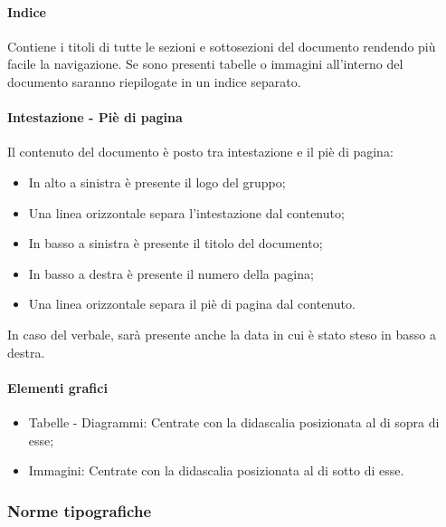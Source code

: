 \paragraph{Indice} 
Contiene i titoli di tutte le sezioni e sottosezioni del documento rendendo più facile la navigazione.
Se sono presenti tabelle o immagini all'interno del documento saranno riepilogate in un indice separato.

\paragraph{Intestazione - Piè di pagina} 
Il contenuto del documento è posto tra intestazione e il piè di pagina:

\begin{itemize}
\item In alto a sinistra è presente il logo del gruppo;
\item Una linea orizzontale separa l’intestazione dal contenuto;
\item In basso a sinistra è presente il titolo del documento;
\item In basso a destra è presente il numero della pagina;
\item Una linea orizzontale separa il piè di pagina dal contenuto.
\end{itemize}

In caso del verbale, sarà presente anche la data in cui è stato steso in basso a destra.

\paragraph{Elementi grafici}
\begin{itemize}
\item Tabelle - Diagrammi: Centrate con la didascalia posizionata al di sopra di esse;
\item Immagini: Centrate con la didascalia posizionata al di sotto di esse.
\end{itemize}


\subsubsection{Norme tipografiche}

